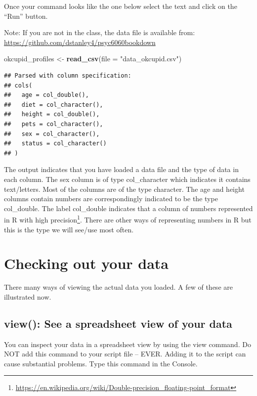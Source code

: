 \documentclass[
]{krantz}
\makeatletter
\newenvironment{Shaded}{\begin{snugshade}}{\end{snugshade}}
\newcommand{\DataTypeTok}[1]{\textcolor[rgb]{0.27,0.27,0.27}{#1}}
\newcommand{\KeywordTok}[1]{\textcolor[rgb]{0.27,0.27,0.27}{\textbf{#1}}}
\newcommand{\NormalTok}[1]{#1}
\newcommand{\StringTok}[1]{\textcolor[rgb]{0.5,0.5,0.5}{#1}}
\renewcommand{\href}[2]{#2\footnote{\url{#1}}}
\newenvironment{kframe}{%
\medskip{}
\setlength{\fboxsep}{.8em}
 \def\at@end@of@kframe{}%
 \ifinner\ifhmode%
  \def\at@end@of@kframe{\end{minipage}}%
  \begin{minipage}{\columnwidth}%
 \fi\fi%
 \def\FrameCommand##1{\hskip\@totalleftmargin \hskip-\fboxsep
 \colorbox{shadecolor}{##1}\hskip-\fboxsep
     \hskip-\linewidth \hskip-\@totalleftmargin \hskip\columnwidth}%
 \MakeFramed {\advance\hsize-\width
   \@totalleftmargin\z@ \linewidth\hsize
   \@setminipage}}%
 {\par\unskip\endMakeFramed%
 \at@end@of@kframe}
\renewenvironment{Shaded}{\begin{kframe}}{\end{kframe}}
\makeatother
\begin{document}
Once your command looks like the one below select the text and click on the ``Run'' button.

Note: If you are not in the class, the data file is available from: \url{https://github.com/dstanley4/psyc6060bookdown}

\begin{Shaded}
\begin{Highlighting}[]
\NormalTok{okcupid_profiles <-}\StringTok{ }\KeywordTok{read_csv}\NormalTok{(}\DataTypeTok{file =} \StringTok{"data_okcupid.csv"}\NormalTok{)}
\end{Highlighting}
\end{Shaded}

\begin{verbatim}
## Parsed with column specification:
## cols(
##   age = col_double(),
##   diet = col_character(),
##   height = col_double(),
##   pets = col_character(),
##   sex = col_character(),
##   status = col_character()
## )
\end{verbatim}

The output indicates that you have loaded a data file and the type of data in each column. The sex column is of type col\_character which indicates it contains text/letters. Most of the columns are of the type character. The age and height columns contain numbers are correspondingly indicated to be the type col\_double. The label col\_double indicates that a column of numbers represented in R with \href{https://en.wikipedia.org/wiki/Double-precision_floating-point_format}{high precision}. There are other ways of representing numbers in R but this is the type we will see/use most often.

\hypertarget{checking-out-your-data}{%
\section{Checking out your data}\label{checking-out-your-data}}

There many ways of viewing the actual data you loaded. A few of these are illustrated now.

\hypertarget{view-see-a-spreadsheet-view-of-your-data}{%
\subsection{view(): See a spreadsheet view of your data}\label{view-see-a-spreadsheet-view-of-your-data}}

You can inspect your data in a spreadsheet view by using the view command. Do NOT add this command to your script file -- EVER. Adding it to the script can cause substantial problems. Type this command in the Console.
\end{document}
